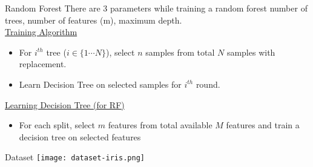 \documentclass{beamer}
\begin{document}
\begin{frame}{Random Forest}
There are 3 parameters while training a random forest number of trees, number of features (m), maximum depth.\\
\vspace{1cm}
\underline{Training Algorithm}\\
\begin{itemize}
	\item For $i^{th}$ tree ($i \in \{1 \cdots N\}$), select $n$ samples from total $N$ samples with replacement.\\
		
		\item Learn Decision Tree on selected samples for $i^{th}$ round.
		 

\end{itemize}

\underline{Learning Decision Tree (for RF)}\\
\begin{itemize}
	\item For each split, select $m$ features from total available $M$ features and train a decision tree on selected features
\end{itemize}


\end{frame}

\begin{frame}{Dataset }
  \texttt{[image: dataset-iris.png]}
\end{frame}


%         
\end{document}

